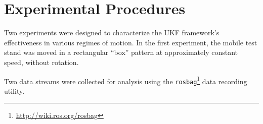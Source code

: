 \section{Experimental Procedures}

Two experiments were designed to characterize the UKF framework's effectiveness in various regimes of motion. In the first experiment, the mobile test stand was moved in a rectangular ``box'' pattern at approximately constant speed, without rotation.


Two data streams were collected for analysis using the \texttt{rosbag}\footnote{\url{http://wiki.ros.org/rosbag}} data recording utility.
